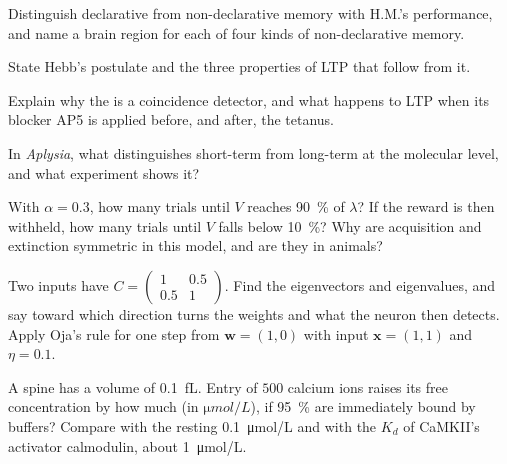 \begin{exercise}[$\star$]\label{exo:b3:learning-memory:1}
Distinguish declarative from non-declarative memory with H.M.'s
performance, and name a brain region for each of four kinds of
non-declarative memory.
\end{exercise}

\begin{exercise}[$\star$]\label{exo:b3:learning-memory:2}
State Hebb's postulate and the three properties of LTP that follow
from it.
\end{exercise}

\begin{exercise}[$\star$]\label{exo:b3:learning-memory:3}
Explain why the  is a coincidence detector, and what
happens to LTP when its blocker AP5 is applied before, and after, the
tetanus.
\end{exercise}

\begin{exercise}[$\star$]\label{exo:b3:learning-memory:4}
In \emph{Aplysia}, what distinguishes short-term from long-term
 at the molecular level, and what experiment shows it?
\end{exercise}

\begin{exercise}[$\star\star$]\label{exo:b3:learning-memory:5}
With $\alpha = 0.3$, how many trials until $V$ reaches \qty{90}{\%} of
$\lambda$? If the reward is then withheld, how many trials until $V$
falls below \qty{10}{\%}? Why are acquisition and extinction symmetric
in this model, and are they in animals?
\end{exercise}

\begin{exercise}[$\star\star$]\label{exo:b3:learning-memory:6}
Two inputs have $C = \begin{pmatrix}1 & 0.5\\ 0.5 & 1\end{pmatrix}$.
Find the eigenvectors and eigenvalues, and say toward which direction
 turns the weights and what the neuron then detects. Apply
Oja's rule for one step from $\mathbf{w} = (1,0)$ with input $\mathbf{x}
= (1,1)$ and $\eta = 0.1$.
\end{exercise}

\begin{exercise}[$\star\star$]\label{exo:b3:learning-memory:7}
A spine has a volume of \qty{0.1}{fL}. Entry of $500$ calcium ions
raises its free concentration by how much (in $\unit{\micro mol/L}$),
if \qty{95}{\%} are immediately bound by buffers? Compare with the
resting \qty{0.1}{\micro mol/L} and with the $K_{d}$ of CaMKII's
activator calmodulin, about \qty{1}{\micro mol/L}.
\end{exercise}

